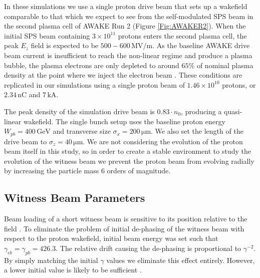 \documentclass[aps,prstab,reprint,amsmath,amssymb,groupedaddress]{revtex4-1}
\newcommand{\unit}[1]{\,\mathrm{#1}}
\newcommand{\funit}[2]{\,\mathrm{#1}/\mathrm{#2}}
\newcommand{\nexp}[1]{\times 10^{#1}}
\begin{document}
In these simulations we use a single proton drive beam that sets up a wakefield comparable to that which we expect to
see from the self-modulated SPS beam in the second plasma cell of AWAKE Run 2 (Figure \ref{Fig:AWAKER2}). When the
initial SPS beam containing $3\nexp{11}$ protons \cite{gschwendtner:2016} enters the second plasma cell, the peak
$E_{z}$ field is expected to be $500-600\funit{MV}{m}$. As the baseline AWAKE drive beam current is insufficient to
reach the non-linear regime and produce a plasma bubble, the plasma electrons are only depleted to around $65\%$ of
nominal plasma density at the point where we inject the electron beam \cite{awake_collaboration:2016}. These conditions
are replicated in our simulations using a single proton beam of $1.46\nexp{10}$ protons, or $2.34\unit{nC}$ and
$7\unit{kA}$.

The peak density of the simulation drive beam is $0.83\cdot n_{0}$, producing a quasi-linear wakefield. The single bunch
setup uses the baseline proton energy $W_{pb} = 400\unit{GeV}$ and transverse size $\sigma_{x} = 200\unit{\mu m}$. We
also set the length of the drive beam to $\sigma_{z} = 40\unit{\mu m}$. We are not considering the evolution of the
proton beam itself in this study, so in order to create a stable environment to study the evolution of the witness beam
we prevent the proton beam from evolving radially by increasing the particle mass 6 orders of magnitude.

\subsection[\label{S:M:Setup}]{Witness Beam Parameters}

Beam loading of a short witness beam is sensitive to its position relative to the field \cite{tzoufras:2009}. To
eliminate the problem of initial de-phasing of the witness beam with respect to the proton wakefield, initial beam
energy was set such that $\gamma_{eb} = \gamma_{pb} = 426.3$. The relative drift causing the de-phasing is proportional
to $\gamma^{-2}$. By simply matching the initial $\gamma$ values we eliminate this effect entirely. However, a lower
initial value is likely to be sufficient \cite{berglyd_olsen:2015}.
\end{document}
